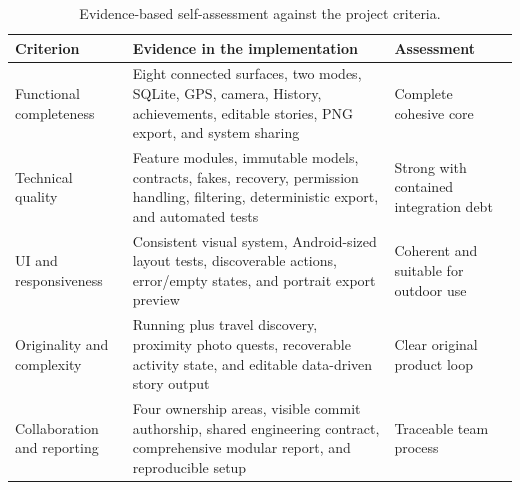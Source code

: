 \begin{table}[htbp]
\centering
\small
\begin{tabularx}{\textwidth}{@{}p{35mm}X p{34mm}@{}}
\toprule
\textbf{Criterion} & \textbf{Evidence in the implementation} &
\textbf{Assessment} \\
\midrule
Functional completeness & Eight connected surfaces, two modes, SQLite, GPS,
camera, History, achievements, editable stories, PNG export, and system sharing &
Complete cohesive core \\
Technical quality & Feature modules, immutable models, contracts, fakes, recovery,
permission handling, filtering, deterministic export, and automated tests & Strong
with contained integration debt \\
UI and responsiveness & Consistent visual system, Android-sized layout tests,
discoverable actions, error/empty states, and portrait export preview & Coherent
and suitable for outdoor use \\
Originality and complexity & Running plus travel discovery, proximity photo
quests, recoverable activity state, and editable data-driven story output & Clear
original product loop \\
Collaboration and reporting & Four ownership areas, visible commit authorship,
shared engineering contract, comprehensive modular report, and reproducible setup &
Traceable team process \\
\bottomrule
\end{tabularx}
\caption{Evidence-based self-assessment against the project criteria.}
\end{table}


